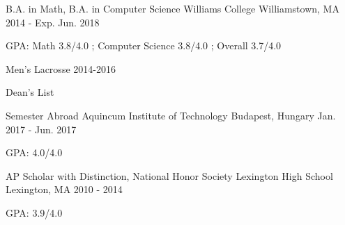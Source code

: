 

\begin{cventries}

\begin{cventry}
  {B.A. in Math, B.A. in Computer Science} %
  {Williams College} %
  {Williamstown, MA} %
  {2014 - Exp. Jun. 2018} %
  {
    \begin{cvitems} %
      \item {GPA: Math 3.8/4.0 ; Computer Science 3.8/4.0 ; Overall 3.7/4.0}
      \item {Men's Lacrosse 2014-2016}
      \item {Dean's List}
    \end{cvitems}
  }
\end{cventry}
\cventry
  {Semester Abroad} %
  {Aquincum Institute of Technology} %
  {Budapest, Hungary} %
  {Jan. 2017 - Jun. 2017} %
  {
    \begin{cvitems} %
      \item {GPA: 4.0/4.0}\\
    \end{cvitems}
  }

\cventry
  {AP Scholar with Distinction, National Honor Society} %
  {Lexington High School} %
  {Lexington, MA} %
  {2010 - 2014} %
  {
    \begin{cvitems} %
      \item {GPA: 3.9/4.0}
    \end{cvitems}
  }

\end{cventries}

